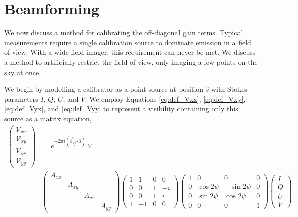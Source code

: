 \section{Beamforming}\label{sec:Beamforming}

We now discuss a method for calibrating the off-diagonal gain terms. Typical measurements require a
single calibration source to dominate emission in a field of view. With a wide field imager, this
requirement can never be met. We discuss a method to artificially restrict the field of view, only
imaging a few points on the sky at once. 

We begin by modelling a calibrator as a point source at position $\hat{s}$ with Stokes parameters
$I$, $Q$, $U$, and $V$. We employ Equations \ref{eq:def_Vxx}, \ref{eq:def_Vxy}, \ref{eq:def_Vyx}, 
and \ref{eq:def_Vyy} to represent a visibility containing only this source as a matrix equation,
\begin{align}
  \begin{pmatrix}\mathcal{V}_{xx}\\\mathcal{V}_{xy}\\\mathcal{V}_{yx}\\\mathcal{V}_{yy}\end{pmatrix}
    &= e^{-2\pi i(\vec{b}_{ij}\cdot\hat{s})} \times
  \nonumber \\
  &\begin{pmatrix}A_{xx}&&&\\&A_{xy}&&\\&&A_{yx}&\\&&&A_{yy}\end{pmatrix}
  \begin{pmatrix}
    1 &  1 & 0 &  0 \\
    0 &  0 & 1 & -i \\
    0 &  0 & 1 &  i \\
    1 & -1 & 0 &  0 
  \end{pmatrix}
  \begin{pmatrix}
    1 &         0 &          0 & 0 \\
    0 & \cos2\psi & -\sin2\psi & 0 \\
    0 & \sin2\psi &  \cos2\psi & 0 \\
    0 &         0 &          0 & 1 
  \end{pmatrix}
\begin{pmatrix}I\\Q\\U\\V\end{pmatrix}.
  \label{eq:def_vismat_full}
\end{align}
